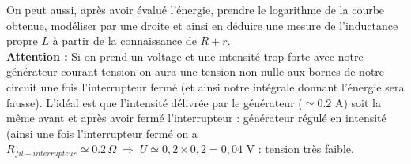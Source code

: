 \documentclass[12pt,prb,aps,epsf]{article}
\begin{document}
On peut aussi, après avoir évalué l'énergie, prendre le logarithme de la courbe obtenue, modéliser par une droite et ainsi en déduire une mesure de l'inductance propre $L$ à partir de la connaissance de $R+r$.\\

\textbf{Attention :} Si on prend un voltage et une intensité trop forte avec notre générateur courant tension on aura une tension non nulle aux bornes de notre circuit une fois l'interrupteur fermé (et ainsi notre intégrale donnant l'énergie sera fausse). L'idéal est que l'intensité délivrée par le générateur ($\simeq 0.2$ A) soit la même avant et après avoir fermé l'interrupteur : générateur régulé en intensité (ainsi une fois l'interrupteur fermé on a $R_{fil+interrupteur} \simeq 0.2\,\Omega\;\Rightarrow\; U\simeq 0,2\times0,2 = 0,04$ V : tension très faible.
\end{document}
